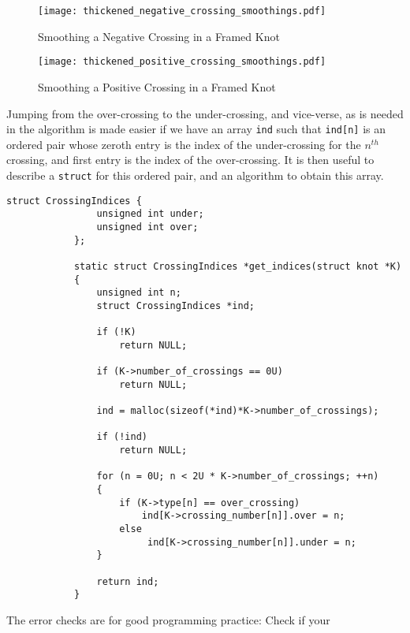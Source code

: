 \documentclass{article}
\theoremstyle{plain}
\begin{document}
        \begin{figure}
            \centering
            \texttt{[image: thickened\_negative\_crossing\_smoothings.pdf]}
            \caption{Smoothing a Negative Crossing in a Framed Knot}
            \label{fig:thickened_negative_crossing_smoothings}
        \end{figure}
        \begin{figure}
            \centering
            \texttt{[image: thickened\_positive\_crossing\_smoothings.pdf]}
            \caption{Smoothing a Positive Crossing in a Framed Knot}
            \label{fig:thickened_positive_crossing_smoothings}
        \end{figure}
        Jumping from the over-crossing to the under-crossing, and vice-verse,
        as is needed in the algorithm is made easier if we have an array
        \texttt{ind} such that \texttt{ind[n]} is an ordered pair whose
        zeroth entry is the index of the under-crossing for the $n^{th}$
        crossing, and first entry is the index of the over-crossing. It is then
        useful to describe a \texttt{struct} for this ordered pair, and an
        algorithm to obtain this array.
        \begin{lstlisting}[style=CStyle, gobble=12]
            struct CrossingIndices {
                unsigned int under;
                unsigned int over;
            };

            static struct CrossingIndices *get_indices(struct knot *K)
            {
                unsigned int n;
                struct CrossingIndices *ind;

                if (!K)
                    return NULL;

                if (K->number_of_crossings == 0U)
                    return NULL;

                ind = malloc(sizeof(*ind)*K->number_of_crossings);

                if (!ind)
                    return NULL;

                for (n = 0U; n < 2U * K->number_of_crossings; ++n)
                {
                    if (K->type[n] == over_crossing)
                        ind[K->crossing_number[n]].over = n;
                    else
                         ind[K->crossing_number[n]].under = n;
                }

                return ind;
            }
        \end{lstlisting}
        The error checks are for good programming practice: Check if your
\end{document}
